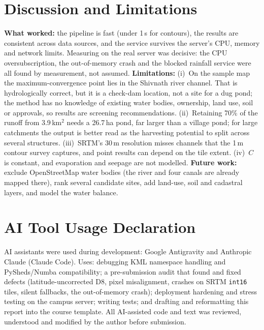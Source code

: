 \documentclass[manuscript,screen,review]{acmart}
\begin{document}
\section{Discussion and Limitations}
\label{sec:discussion}
\textbf{What worked:} the pipeline is fast (under 1\,s for contours), the results are consistent across data sources, and the service survives the server's CPU, memory and network limits. Measuring on the real server was decisive: the CPU oversubscription, the out-of-memory crash and the blocked rainfall service were all found by measurement, not assumed.
\textbf{Limitations:}
(i)~On the sample map the maximum-convergence point lies in the Shivnath river channel. That is hydrologically correct, but it is a check-dam location, not a site for a dug pond; the method has no knowledge of existing water bodies, ownership, land use, soil or approvals, so results are screening recommendations.
(ii)~Retaining 70\% of the runoff from 3.9\,km$^2$ needs a 26.7\,ha pond, far larger than a village pond; for large catchments the output is better read as the harvesting potential to split across several structures.
(iii)~SRTM's 30\,m resolution misses channels that the 1\,m contour survey captures, and point results can depend on the tile extent.
(iv)~$C$ is constant, and evaporation and seepage are not modelled.
\textbf{Future work:} exclude OpenStreetMap water bodies (the river and four canals are already mapped there), rank several candidate sites, add land-use, soil and cadastral layers, and model the water balance.

\section{AI Tool Usage Declaration}
\label{sec:ai-usage}
AI assistants were used during development: Google Antigravity and Anthropic Claude (Claude Code). Uses: debugging KML namespace handling and PySheds/Numba compatibility; a pre-submission audit that found and fixed defects (latitude-uncorrected D8, pixel misalignment, crashes on SRTM \texttt{int16} tiles, silent fallbacks, the out-of-memory crash); deployment hardening and stress testing on the campus server; writing tests; and drafting and reformatting this report into the course template. All AI-assisted code and text was reviewed, understood and modified by the author before submission.

\appendix
\end{document}

